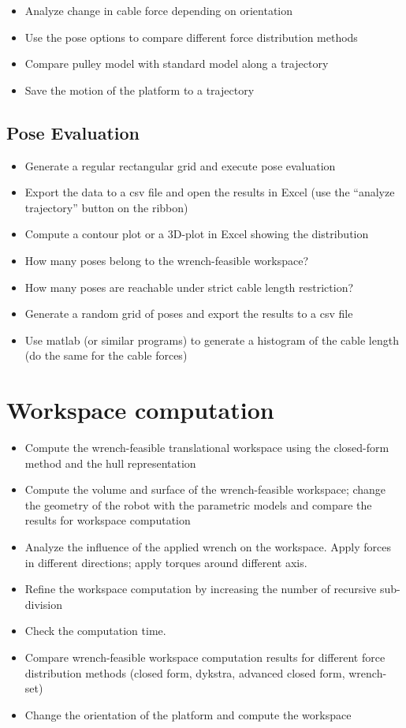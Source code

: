 \begin{itemize}
\item  {Analyze change in cable force depending on
  orientation}
\item  {Use the pose options to compare different force
  distribution
  methods}
\item  {Compare pulley model with standard model along a
  trajectory}
\item  {Save the motion of the platform to a
  trajectory}
\end{itemize}

\subsection{Pose Evaluation}

\begin{itemize}
\item  {Generate a regular rectangular grid and execute pose
  evaluation}
\item  {Export the data to a csv file and open the results in
  Excel (use the ``analyze trajectory'' button on the
  ribbon)}
\item  {Compute a contour plot or a 3D-plot in Excel showing
  the
  distribution}
\item  {How many poses belong to the wrench-feasible
  workspace?}
\item  {How many poses are reachable under strict cable length
  restriction?}
\item  {Generate a random grid of poses and export the results
  to a csv
  file}
\item  {Use matlab (or similar programs) to generate a
  histogram of the cable length (do the same for the cable
  forces)}
\end{itemize}

\section{Workspace computation}

\begin{itemize}
\item  {Compute the wrench-feasible translational workspace
  using the closed-form method and the hull
  representation}
\item  {Compute the volume and surface of the wrench-feasible
  workspace; change the geometry of the robot with the parametric models
  and compare the results for workspace
  computation}
\item  {Analyze the influence of the applied wrench on the
  workspace. Apply forces in different directions; apply torques around
  different axis.
  }
\item  {Refine the workspace computation by increasing the
  number of recursive
  sub-division}
\item  {Check the computation
  time.}
\item  {Compare wrench-feasible workspace computation results
  for different force distribution methods (closed form, dykstra,
  advanced closed form,
  wrench-set)}
\item  {Change the orientation of the platform and compute the
  workspace}
\end{itemize}

